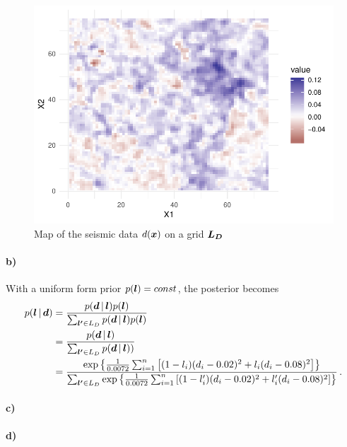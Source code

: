 \begin{figure}
    \centering
    \includegraphics[scale=0.95]{figures/seismic_data.pdf}
    \caption{Map of the seismic data $d(\bm{x})$ on a grid $\bm{L_D}$}
    \label{fig:data}
\end{figure}
\paragraph{b)}
With a uniform form prior $p(\bm{l}) = const$, the posterior becomes
%
\begin{equation}
\label{eq:b_post}
\begin{split}
    p(\bm{l} \, | \, \bm{d}) &= \frac{p(\bm{d} \, | \, \bm{l}) p(\bm{l})}{\sum_{\bm{l'} \in L_D} p(\bm{d} \, | \, \bm{l}) p(\bm{l})} \\
    &= \frac{p(\bm{d} \, | \, \bm{l})}{\sum_{\bm{l'} \in L_D} p(\bm{d} \, | \, \bm{l}))} \\
    &= \frac{\exp\left\{\frac{1}{0.0072} \sum_{i=1}^n \left[(1-l_i)(d_i - 0.02)^2 + l_i(d_i - 0.08)^2\right]\right\}}{\sum_{\bm{l'} \in L_D} \exp\left\{\frac{1}{0.0072} \sum_{i=1}^n \left[(1-l_i')(d_i - 0.02)^2 + l_i'(d_i - 0.08)^2\right]\right\}} \, .
\end{split}
\end{equation}
%

\paragraph{c)}


\paragraph{d)}

